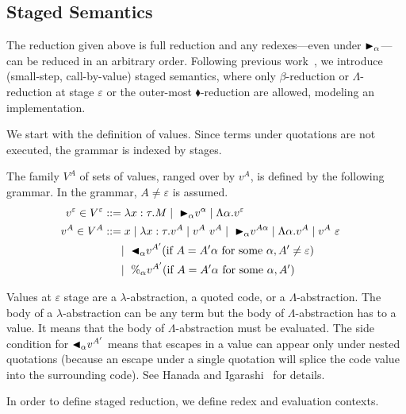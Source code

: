 \subsection{Staged Semantics}

The reduction given above is full reduction and any redexes---even
under ${\mathop{\blacktriangleright}}_\alpha$---can be reduced in an arbitrary order.
Following previous work~\cite{Hanada2014},
we introduce (small-step, call-by-value) staged semantics,
where only $\beta$-reduction or $\Lambda$-reduction at stage $\varepsilon$ or the outer-most $\blacklozenge$-reduction are allowed,
modeling an implementation.

We start with the definition of values. Since terms under quotations are
not executed, the grammar is indexed by stages.

\begin{definition}[Values]
  The family $V^A$ of sets of values, ranged over by $v^A$,
  is defined by the following grammar.  In the grammar, $A \neq \varepsilon$ is assumed.
  \begin{align*}
    v^\varepsilon \in V^\varepsilon & ::= \lambda x:\tau.M \mid\ {\mathop{\blacktriangleright}}_\alpha v^\alpha \mid \Lambda\alpha.v^\varepsilon                                       & \\
    v^A \in V^A                     & ::= x \mid \lambda x:\tau.v^A \mid v^A\ v^A \mid\ {\mathop{\blacktriangleright}}_\alpha v^{A\alpha} \mid \Lambda\alpha.v^A \mid v^A\ \varepsilon & \\
                                    & \quad\   \mid\ {\mathop{\blacktriangleleft}}_\alpha v^{A'} (\text{if } A = A'\alpha \text{ for some } \alpha, A' \neq \varepsilon)             & \\
                                    & \quad\   \mid\ \%_\alpha v^{A'} (\text{if } A = A'\alpha  \text{ for some } \alpha, A')
  \end{align*}
\end{definition}

Values at $\varepsilon$ stage are a $\lambda$-abstraction, a quoted code,
or a $\Lambda$-abstraction.  The body of a $\lambda$-abstraction can
be any term but the body of $\Lambda$-abstraction has to a value.  It
means that the body of $\Lambda$-abstraction must be evaluated.  The
side condition for ${\mathop{\blacktriangleleft}}_\alpha v^{A'}$ means that escapes in a value
can appear only under nested quotations (because an escape under a
single quotation will splice the code value into the surrounding
code).  See Hanada and Igarashi~\cite{Hanada2014} for details.

In order to define staged reduction, we define redex and evaluation contexts.

